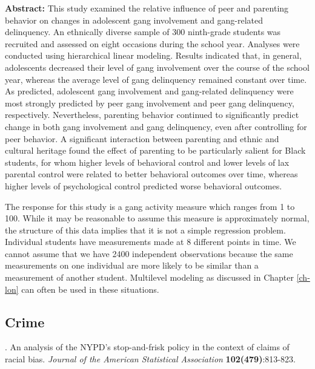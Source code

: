 \documentclass[
]{krantz}
\renewenvironment{quote}{\begin{VF}}{\end{VF}}
\begin{document}
\begin{quote}
\textbf{Abstract:} This study examined the relative influence of peer and parenting behavior on changes in adolescent gang involvement and gang-related delinquency. An ethnically diverse sample of 300 ninth-grade students was recruited and assessed on eight occasions during the school year. Analyses were conducted using hierarchical linear modeling. Results indicated that, in general, adolescents decreased their level of gang involvement over the course of the school year, whereas the average level of gang delinquency remained constant over time. As predicted, adolescent gang involvement and gang-related delinquency were most strongly predicted by peer gang involvement and peer gang delinquency, respectively. Nevertheless, parenting behavior continued to significantly predict change in both gang involvement and gang delinquency, even after controlling for peer behavior. A significant interaction between parenting and ethnic and cultural heritage found the effect of parenting to be particularly salient for Black students, for whom higher levels of behavioral control and lower levels of lax parental control were related to better behavioral outcomes over time, whereas higher levels of psychological control predicted worse behavioral outcomes.
\end{quote}

The response for this study is a gang activity measure which ranges from 1 to 100. While it may be reasonable to assume this measure is approximately normal, the structure of this data implies that it is not a simple regression problem. Individual students have measurements made at 8 different points in time. We cannot assume that we have 2400 independent observations because the same measurements on one individual are more likely to be similar than a measurement of another student. Multilevel modeling as discussed in Chapter \ref{ch-lon} can often be used in these situations.

\hypertarget{crime}{%
\subsection{Crime}\label{crime}}

\citet{Gelman2007} . An analysis of the NYPD's stop-and-frisk policy in the context of claims of racial bias. \emph{Journal of the American Statistical Association} \textbf{102(479)}:813-823.
\end{document}
